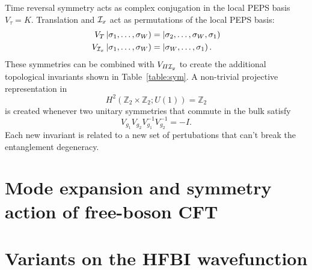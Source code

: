 Time reversal symmetry acts as complex conjugation in the local PEPS basis $V_{\tau}=K$.
Translation and $\mathcal{I}_x$ act as permutations of the local PEPS basis:
\begin{equation*}
\begin{split}
V_{T}\left |\sigma_1, \ldots, \sigma_{W} \right ) &= \left |\sigma_2, \ldots, \sigma_{W}, \sigma_{1} \right ) \\
V_{\mathcal{I}_x}\left |\sigma_1, \ldots, \sigma_{W} \right ) &= \left |\sigma_W, \ldots, \sigma_{1} \right ).
\end{split}
\end{equation*}
These symmetries can be combined with $V_{\varPi \mathcal{I}_y}$ to create the additional topological 
invariants shown in Table~\ref{table:sym}. A non-trivial projective 
representation in $$H^2(\mathbb{Z}_2 \times \mathbb{Z}_2; U(1)) = \mathbb{Z}_2$$
is created whenever two unitary symmetries that commute in the bulk satisfy 
$$V_{g_1} V_{g_2} V_{g_1}^{-1} V_{g_2}^{-1} = -I.$$
Each new invariant is related to a new set of pertubations that can't break the entanglement 
degeneracy. 

\section{Mode expansion and symmetry action of free-boson CFT}
\label{Appendix:CFT}

\section{Variants on the HFBI wavefunction}
\label{Appendix:Variants}